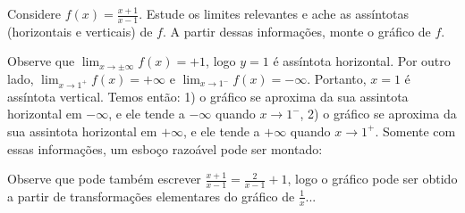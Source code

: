 \begin{exo}
Considere $f(x)=\frac{x+1}{x-1}$. Estude os limites relevantes e 
ache as assíntotas (horizontais e verticais) de $f$. A partir dessas
informações, monte o gráfico de $f$.
\begin{sol}
Observe que $\lim_{x\to \pm\infty}f(x)=+1$, logo $y=1$ é assíntota 
horizontal. 
Por outro lado, $\lim_{x\to 1^+}f(x)=+\infty$ e $\lim_{x\to 1^-}f(x)
=-\infty$. Portanto, $x=1$ é assíntota vertical. 
Temos então: 1) o gráfico se aproxima da sua assintota horizontal em 
$-\infty$, e ele tende a $-\infty$ quando $x\to 1^-$,
2) o gráfico se aproxima da sua assintota horizontal em $+\infty$, e 
ele tende a $+\infty$ quando $x\to 1^+$.
Somente com essas informações, um esboço razoável pode ser montado: 
\begin{center}
\begin{bmlimage}\end{bmlimage}
\end{center}
Observe que pode também escrever $\frac{x+1}{x-1}=\frac{2}{x-1}+1$, 
logo o gráfico pode ser obtido a partir de transformações elementares
do gráfico de $\frac1x$...
\end{sol}
\end{exo}


